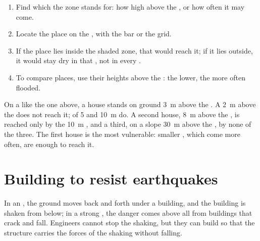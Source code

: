 \begin{method}
\begin{enumerate}
  \item Find which  the zone stands for: how high above the ,
        or how often it may come.
  \item Locate the place on the , with the  bar or the grid.
  \item If the place lies inside the shaded zone, that  would reach
        it; if it lies outside, it would stay dry in that , not in
        every .
  \item To compare places, use their heights above the : the
        lower, the more often flooded.
\end{enumerate}
\end{method}

\begin{example}
On a  like the one above, a house stands on
ground \qty{3}{m} above the . A  \qty{2}{m} above the 
does not reach it;  of 5 and \qty{10}{m} do. A second house,
\qty{8}{m} above the , is reached only by the \qty{10}{m} , and
a third, on a slope \qty{30}{m} above the , by none of the three.
The first house is the most vulnerable: smaller , which come more
often, are enough to reach it.
\end{example}

\section{Building to resist earthquakes}

In an , the ground moves back and forth under a building, and
the building is shaken from below; in a strong , the danger
comes above all from buildings that crack and fall. Engineers cannot stop
the shaking, but they can build so that the structure carries the forces
of the shaking without falling.

